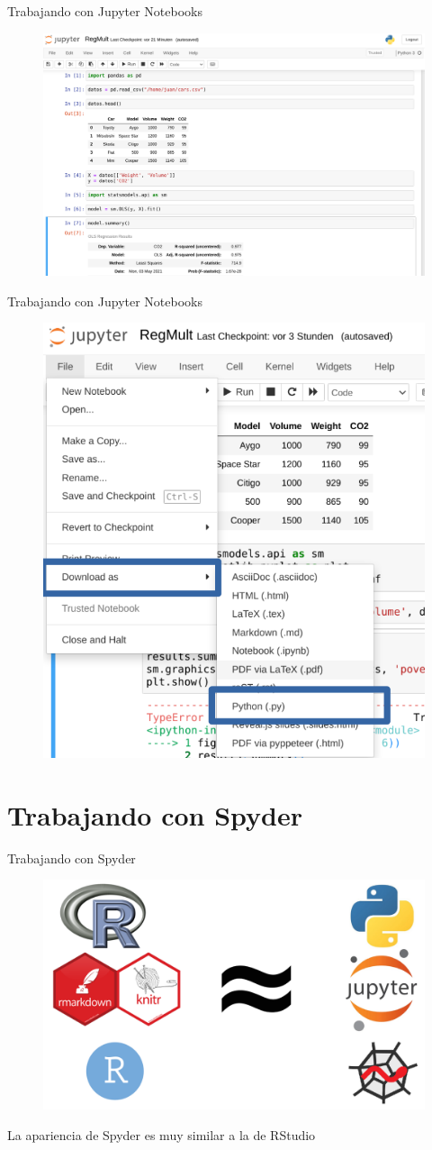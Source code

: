\documentclass{beamer}
\begin{document}
\begin{frame}{Trabajando con Jupyter Notebooks}
\begin{figure}
\includegraphics[width=.85\textwidth]{RM.png}
\end{figure}
\end{frame}

\begin{frame}{Trabajando con Jupyter Notebooks}
\begin{figure}
\includegraphics[width=.55\textwidth]{Dsk.png}
\end{figure}
\end{frame}

\section{Trabajando con Spyder}
\begin{frame}{Trabajando con Spyder}
\begin{figure}
\includegraphics[width=.75\textwidth]{eq.png}
\end{figure}
La apariencia de Spyder es muy similar a la de RStudio 
\end{frame}
\end{document}

